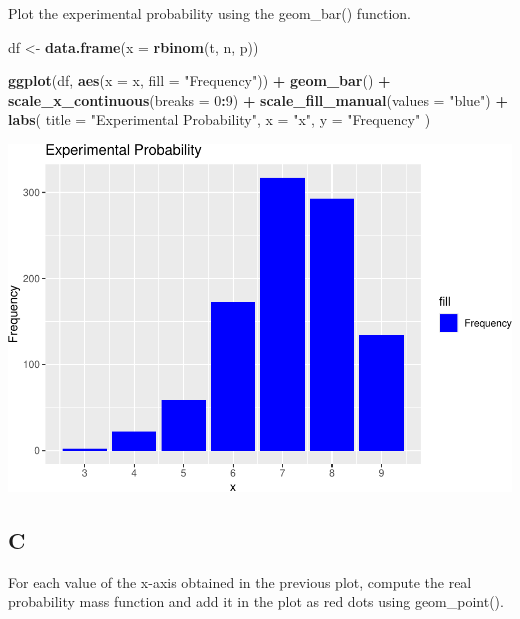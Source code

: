 \documentclass[
]{article}
\newenvironment{Shaded}{\begin{snugshade}}{\end{snugshade}}
\newcommand{\DataTypeTok}[1]{\textcolor[rgb]{0.13,0.29,0.53}{#1}}
\newcommand{\DecValTok}[1]{\textcolor[rgb]{0.00,0.00,0.81}{#1}}
\newcommand{\KeywordTok}[1]{\textcolor[rgb]{0.13,0.29,0.53}{\textbf{#1}}}
\newcommand{\NormalTok}[1]{#1}
\newcommand{\OperatorTok}[1]{\textcolor[rgb]{0.81,0.36,0.00}{\textbf{#1}}}
\newcommand{\StringTok}[1]{\textcolor[rgb]{0.31,0.60,0.02}{#1}}
\begin{document}
Plot the experimental probability using the geom\_bar() function.

\begin{Shaded}
\begin{Highlighting}[]
\NormalTok{df \textless{}{-}}\StringTok{ }\KeywordTok{data.frame}\NormalTok{(}\DataTypeTok{x =} \KeywordTok{rbinom}\NormalTok{(t, n, p))}

\KeywordTok{ggplot}\NormalTok{(df, }\KeywordTok{aes}\NormalTok{(}\DataTypeTok{x =}\NormalTok{ x, }\DataTypeTok{fill =} \StringTok{"Frequency"}\NormalTok{)) }\OperatorTok{+}
\StringTok{  }\KeywordTok{geom\_bar}\NormalTok{() }\OperatorTok{+}
\StringTok{  }\KeywordTok{scale\_x\_continuous}\NormalTok{(}\DataTypeTok{breaks =} \DecValTok{0}\OperatorTok{:}\DecValTok{9}\NormalTok{) }\OperatorTok{+}
\StringTok{  }\KeywordTok{scale\_fill\_manual}\NormalTok{(}\DataTypeTok{values =} \StringTok{"blue"}\NormalTok{) }\OperatorTok{+}
\StringTok{  }\KeywordTok{labs}\NormalTok{(}
    \DataTypeTok{title =} \StringTok{"Experimental Probability"}\NormalTok{,}
    \DataTypeTok{x =} \StringTok{"x"}\NormalTok{,}
    \DataTypeTok{y =} \StringTok{"Frequency"}
\NormalTok{  )}
\end{Highlighting}
\end{Shaded}

\includegraphics{es_files/figure-latex/unnamed-chunk-14-1.pdf}

\hypertarget{c}{%
\subsection{C}\label{c}}

For each value of the x-axis obtained in the previous plot, compute the
real probability mass function and add it in the plot as red dots using
geom\_point().
\end{document}
